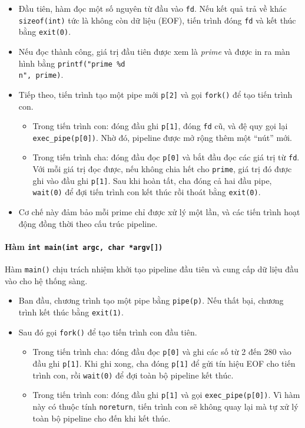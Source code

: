 \begin{itemize}
    \item Đầu tiên, hàm đọc một số nguyên từ đầu vào \texttt{fd}. Nếu kết quả trả về khác \texttt{sizeof(int)} tức là không còn dữ liệu (EOF), tiến trình đóng \texttt{fd} và kết thúc bằng \texttt{exit(0)}.
    \item Nếu đọc thành công, giá trị đầu tiên được xem là \textit{prime} và được in ra màn hình bằng \texttt{printf("prime \%d\\n", prime)}.
    \item Tiếp theo, tiến trình tạo một pipe mới \texttt{p[2]} và gọi \texttt{fork()} để tạo tiến trình con.
    \begin{itemize}
        \item Trong tiến trình con: đóng đầu ghi \texttt{p[1]}, đóng \texttt{fd} cũ, và đệ quy gọi lại \texttt{exec\_pipe(p[0])}. Nhờ đó, pipeline được mở rộng thêm một “nút” mới.
        \item Trong tiến trình cha: đóng đầu đọc \texttt{p[0]} và bắt đầu đọc các giá trị từ \texttt{fd}. Với mỗi giá trị đọc được, nếu không chia hết cho \texttt{prime}, giá trị đó được ghi vào đầu ghi \texttt{p[1]}. Sau khi hoàn tất, cha đóng cả hai đầu pipe, \texttt{wait(0)} để đợi tiến trình con kết thúc rồi thoát bằng \texttt{exit(0)}.
    \end{itemize}
    \item Cơ chế này đảm bảo mỗi prime chỉ được xử lý một lần, và các tiến trình hoạt động đồng thời theo cấu trúc pipeline.
\end{itemize}

\paragraph{Hàm \texttt{int main(int argc, char *argv[])}}
Hàm \texttt{main()} chịu trách nhiệm khởi tạo pipeline đầu tiên và cung cấp dữ liệu đầu vào cho hệ thống sàng.

\begin{itemize}
    \item Ban đầu, chương trình tạo một pipe bằng \texttt{pipe(p)}. Nếu thất bại, chương trình kết thúc bằng \texttt{exit(1)}.
    \item Sau đó gọi \texttt{fork()} để tạo tiến trình con đầu tiên.
    \begin{itemize}
        \item Trong tiến trình cha: đóng đầu đọc \texttt{p[0]} và ghi các số từ 2 đến 280 vào đầu ghi \texttt{p[1]}. Khi ghi xong, cha đóng \texttt{p[1]} để gửi tín hiệu EOF cho tiến trình con, rồi \texttt{wait(0)} để đợi toàn bộ pipeline kết thúc.
        \item Trong tiến trình con: đóng đầu ghi \texttt{p[1]} và gọi \texttt{exec\_pipe(p[0])}. Vì hàm này có thuộc tính \texttt{noreturn}, tiến trình con sẽ không quay lại mà tự xử lý toàn bộ pipeline cho đến khi kết thúc.
    \end{itemize}
\end{itemize}
